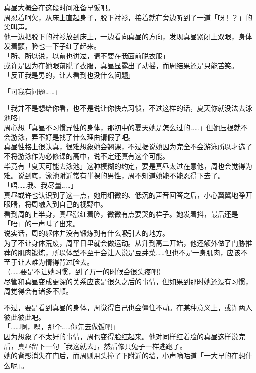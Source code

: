 真昼大概会在这段时间准备早饭吧。\\

周忍着呵欠，从床上直起身子，脱下衬衫，接着就在旁边听到了一道「呀！？」的尖叫声。\\

他一边把脱下的衬衫放到床上，一边看向真昼的方向，发现真昼紧闭上双眼，身体发着颤，脸也一下子红了起来。\\

「所、所以说，以前也讲过，请不要在我面前脱衣服」\\

或许是因为在她眼前脱了衣服，真昼显露出了动摇，而周结果还是只能苦笑。\\

「反正我是男的，让人看到也没什么问题」

「可我有问题……」

「我并不是想给你看，也不是说让你快点习惯，不过这样的话，夏天你就没法去泳池咯」\\

周心想「真昼不习惯异性的身体，那初中的夏天她是怎么过的……」但她压根就不会游泳，弄不好是找了什么理由请假了吧。\\

真昼性格上很认真，很难想象她会翘课，不过据说她因为完全不会游泳所以才选了不将游泳作为必修课的高中，说不定还真有这个可能。\\

毕竟有「夏天可能去泳池」这种模糊的约定，要是真昼太过在意他，周也会觉得为难。说到底，泳池附近常有半裸的男性，周不知道她能不能忍得下去了。\\

「唔……我、我尽量……」\\

真昼或许也认识到了这一点，她用细微的、低沉的声音回答之后，小心翼翼地睁开眼睛，将周融入到自己的视野中。\\

看到周的上半身，真昼涨红着脸，微微有点要哭的样子。她发着抖，最后还是「唔」的一声叫了出来。\\

说实话，周的躯体并没有锻炼到有什么吸引人的地方。\\

为了不让身体荒废，周平日里就会做运动。从升到高二开始，他还额外做了门胁推荐的肌肉锻炼，所以体型不至于会让人说是豆芽菜……但也不是一身肌肉，应该不至于让人难为情得背过脸去。\\

（……要是不让她习惯，到了万一的时候会很头疼吧）\\

尽管和真昼变成更深的关系应该是很久之后的事情，但如果到那时她还没有习惯，周觉得会有诸多不顺。

不过，要是看到真昼的身体，周觉得自己也会僵住不动。在某种意义上，或许两人彼此彼此吧。\\

「……啊，嗯，那个……你先去做饭吧」\\

因为想象了不太好的事情，周也变得脸红起来。他对同样红着脸的真昼这样说完后，真昼留下一句「我这就去」，然后像只兔子一样逃跑了。\\

她的背影消失在门后，而周则用头撞了下附近的墙，小声嘀咕道「一大早的在想什么呢」。

